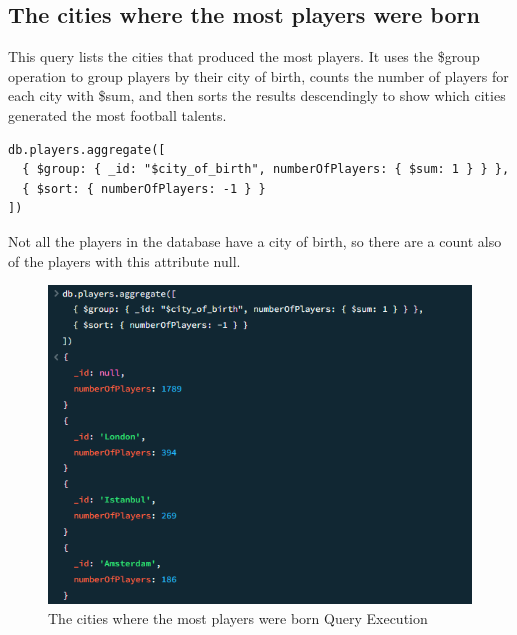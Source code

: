 \documentclass{Configuration_Files/PoliMi3i_thesis}
\begin{document}
\subsection{The cities where the most players were born}
This query lists the cities that produced the most players. It uses the \$group operation to group players by their city of birth, counts the number of players for each city with \$sum, and then sorts the results descendingly to show which cities generated the most football talents.
\begin{verbatim}
db.players.aggregate([
  { $group: { _id: "$city_of_birth", numberOfPlayers: { $sum: 1 } } },
  { $sort: { numberOfPlayers: -1 } }
])
\end{verbatim}
Not all the players in the database have a city of birth, so there are a count also of the players with this attribute null.
\begin{figure}[htbp]
    \centering
    \includegraphics[scale=1.1]{Images/Queries/Cities/cities.png}
    \caption{The cities where the most players were born Query Execution}
\end{figure}
\end{document}
